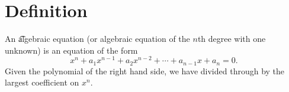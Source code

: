 
\section*{Definition}

An \t{algebraic equation} (or algebraic equation of the $n$th degree with one unknown) is an equation of the form
\[
x^n + a_1 x^{n-1} + a_2x^{n-2} + \cdots + a_{n-1}x + a_n = 0.
\]
Given the polynomial of the right hand side, we have divided through by the largest coefficient on $x^n$.

\blankpage